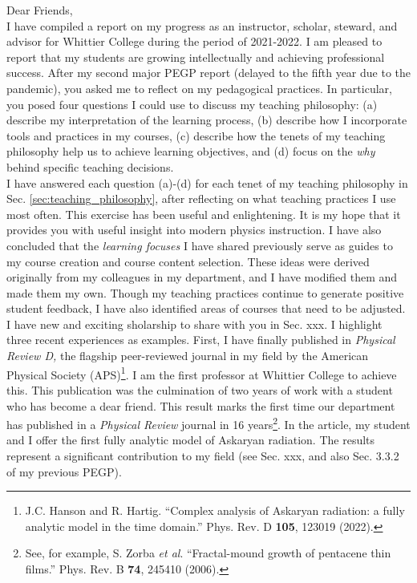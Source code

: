 \documentclass[../../main.tex]{subfiles}
\begin{document}
Dear Friends,
\\
\vspace{0.15cm}
I have compiled a report on my progress as an instructor, scholar, steward, and advisor for Whittier College during the period of 2021-2022.  I am pleased to report that my students are growing intellectually and achieving professional success.  After my second major PEGP report (delayed to the fifth year due to the pandemic), you asked me to reflect on my pedagogical practices.  In particular, you posed four questions I could use to discuss my teaching philosophy: (a) describe my interpretation of the learning process, (b) describe how I incorporate tools and practices in my courses, (c) describe how the tenets of my teaching philosophy help us to achieve learning objectives, and (d) focus on the \textit{why} behind specific teaching decisions.
\\
\vspace{0.25cm}
I have answered each question (a)-(d) for each tenet of my teaching philosophy in Sec. \ref{sec:teaching_philosophy}, after reflecting on what teaching practices I use most often.  This exercise has been useful and enlightening.  It is my hope that it provides you with useful insight into modern physics instruction.  I have also concluded that the \textit{learning focuses} I have shared previously serve as guides to my course creation and course content selection.  These ideas were derived originally from my colleagues in my department, and I have modified them and made them my own.  Though my teaching practices continue to generate positive student feedback, I have also identified areas of courses that need to be adjusted.
\\
\vspace{0.25cm}
I have new and exciting sholarship to share with you in Sec. xxx.  I highlight three recent experiences as examples.  First, I have finally published in \textit{Physical Review D,} the flagship peer-reviewed journal in my field by the American Physical Society (APS)\footnote{J.C. Hanson and R. Hartig. ``Complex analysis of Askaryan radiation: a fully analytic model in the time domain.'' Phys. Rev. D \textbf{105}, 123019 (2022).}.  I am the first professor at Whittier College to achieve this.  This publication was the culmination of two years of work with a student who has become a dear friend.  This result marks the first time our department has published in a \textit{Physical Review} journal in 16 years\footnote{See, for example, S. Zorba \textit{et al}. ``Fractal-mound growth of pentacene thin films.'' Phys. Rev. B \textbf{74}, 245410 (2006).}.  In the article, my student and I offer the first fully analytic model of Askaryan radiation.  The results represent a significant contribution to my field (see Sec. xxx, and also Sec. 3.3.2 of my previous PEGP).
\end{document}
